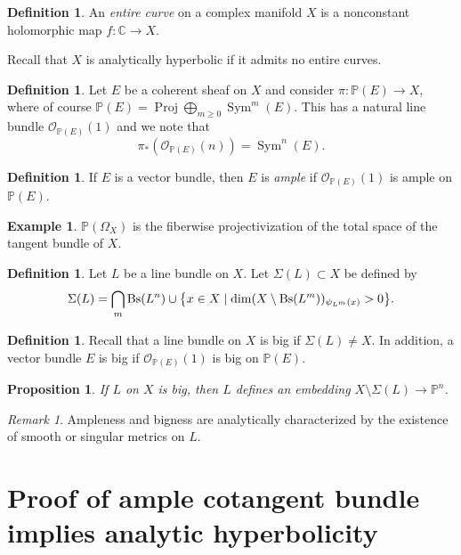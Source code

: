 \documentclass[leqno, openany]{memoir}
\newtheorem{prop}[thm]{Proposition}
\theoremstyle{definition}
\newtheorem{defn}[thm]{Definition}
\newtheorem{exm}[thm]{Example}
\theoremstyle{remark}
\newtheorem{rmk}[thm]{Remark}
\theoremstyle{plain}
\theoremstyle{definition}
\theoremstyle{remark}
\newcommand{\C}{\mathbb{C}}
\renewcommand{\P}{\mathbb{P}}
\newcommand{\mc}[1]{\mathcal{#1}}
\newcommand{\on}[1]{\operatorname{#1}}
\DeclareMathOperator{\Proj}{Proj}
\begin{document}
\begin{defn}
    An \textit{entire curve} on a complex manifold $X$ is a nonconstant holomorphic map $f \colon \C \to X$.
\end{defn}

Recall that $X$ is analytically hyperbolic if it admits no entire curves.

\begin{defn}
    Let $E$ be a coherent sheaf on $X$ and consider $\pi \colon \P(E) \to X$, where of course $\P(E) = \Proj \bigoplus_{m \geq 0} \on{Sym}^m(E)$. This has a natural line bundle $\mc{O}_{\P(E)}(1)$ and we note that
    \[ \pi_*(\mc{O}_{\P(E)}(n)) = \on{Sym}^n (E). \]
\end{defn}

\begin{defn}
    If $E$ is a vector bundle, then $E$ is \textit{ample} if $\mc{O}_{\P(E)}(1)$ is ample on $\P(E)$.
\end{defn}

\begin{exm}
    $\P(\Omega_X)$ is the fiberwise projectivization of the total space of the tangent bundle of $X$.
\end{exm}

\begin{defn}
    Let $L$ be a line bundle on $X$. Let $\Sigma(L) \subset X$ be defined by
    \[ \Sigma(L) = \bigcap_m \on{Bs}(L^n) \cup \qty{x \in X \mid \dim (X \setminus \on{Bs}(L^m))_{\psi_{L^m}(x)} > 0}. \]
\end{defn}

\begin{defn}
    Recall that a line bundle on $X$ is big if $\Sigma(L) \neq X$. In addition, a vector bundle $E$ is big if $\mc{O}_{\P(E)}(1)$ is big on $\P(E)$.
\end{defn}

\begin{prop}
    If $L$ on $X$ is big, then $L$ defines an embedding $X \setminus \Sigma(L) \to \P^n$.
\end{prop}

\begin{rmk}
    Ampleness and bigness are analytically characterized by the existence of smooth or singular metrics on $L$.
\end{rmk}

\section{Proof of ample cotangent bundle implies analytic hyperbolicity}
\end{document}
